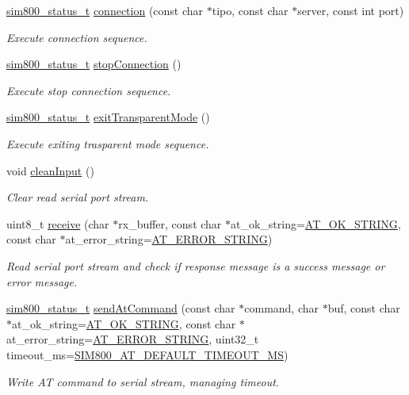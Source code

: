 \begin{DoxyCompactItemize}
\hyperlink{sim800_8h_a3d1eeaa095df003ea28385b81a134b27}{sim800\+\_\+status\+\_\+t} \hyperlink{classSIM800_a834bbcd0087d6f3ef3474b5914c39e3a}{connection} (const char $\ast$tipo, const char $\ast$server, const int port)
\begin{DoxyCompactList}\small\item\em Execute connection sequence. \end{DoxyCompactList}\item 
\hyperlink{sim800_8h_a3d1eeaa095df003ea28385b81a134b27}{sim800\+\_\+status\+\_\+t} \hyperlink{classSIM800_aac1e10bd21b00bfafc4487891a04e9d3}{stop\+Connection} ()
\begin{DoxyCompactList}\small\item\em Execute stop connection sequence. \end{DoxyCompactList}\item 
\hyperlink{sim800_8h_a3d1eeaa095df003ea28385b81a134b27}{sim800\+\_\+status\+\_\+t} \hyperlink{classSIM800_a3c73206225b81654384e625faadb1b49}{exit\+Transparent\+Mode} ()
\begin{DoxyCompactList}\small\item\em Execute exiting trasparent mode sequence. \end{DoxyCompactList}\item 
void \hyperlink{classSIM800_ad6ea4550521aee8f55656cede649baff}{clean\+Input} ()
\begin{DoxyCompactList}\small\item\em Clear read serial port stream. \end{DoxyCompactList}\item 
uint8\+\_\+t \hyperlink{classSIM800_a4dfa4237d627c04532156d476f29dacf}{receive} (char $\ast$rx\+\_\+buffer, const char $\ast$at\+\_\+ok\+\_\+string=\hyperlink{sim800_8h_a1da24009e90c1a5de1d1f0bc0dda6dc6}{A\+T\+\_\+\+O\+K\+\_\+\+S\+T\+R\+I\+NG}, const char $\ast$at\+\_\+error\+\_\+string=\hyperlink{sim800_8h_a883ea39010a33ca1b400940a65869e47}{A\+T\+\_\+\+E\+R\+R\+O\+R\+\_\+\+S\+T\+R\+I\+NG})
\begin{DoxyCompactList}\small\item\em Read serial port stream and check if response message is a success message or error message. \end{DoxyCompactList}\item 
\hyperlink{sim800_8h_a3d1eeaa095df003ea28385b81a134b27}{sim800\+\_\+status\+\_\+t} \hyperlink{classSIM800_a3ff02a2d318c230bc3711af6316a28c3}{send\+At\+Command} (const char $\ast$command, char $\ast$buf, const char $\ast$at\+\_\+ok\+\_\+string=\hyperlink{sim800_8h_a1da24009e90c1a5de1d1f0bc0dda6dc6}{A\+T\+\_\+\+O\+K\+\_\+\+S\+T\+R\+I\+NG}, const char $\ast$at\+\_\+error\+\_\+string=\hyperlink{sim800_8h_a883ea39010a33ca1b400940a65869e47}{A\+T\+\_\+\+E\+R\+R\+O\+R\+\_\+\+S\+T\+R\+I\+NG}, uint32\+\_\+t timeout\+\_\+ms=\hyperlink{sim800_8h_a0499ea42358376e7a0c09e540ab7219a}{S\+I\+M800\+\_\+\+A\+T\+\_\+\+D\+E\+F\+A\+U\+L\+T\+\_\+\+T\+I\+M\+E\+O\+U\+T\+\_\+\+MS})
\begin{DoxyCompactList}\small\item\em Write AT command to serial stream, managing timeout. \end{DoxyCompactList}\end{DoxyCompactItemize}
